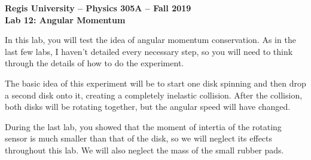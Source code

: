 \documentclass[11pt]{article}
\begin{document}
\begin{center}
{\bf{Regis University -- Physics 305A -- Fall 2019}} \\
{\bf{Lab 12: Angular Momentum}} \\
\end{center}

In this lab, you will test the idea of angular momentum conservation.
As in the last few labs, I haven't detailed every necessary step, so you will need to 
think through the details of how to do the experiment.

The basic idea of this experiment will be to start one disk spinning and then drop a second disk onto it, creating a completely inelastic collision. After the collision, both disks will be rotating together, but the angular speed will have changed.

During the last lab, you showed that the moment of intertia of the rotating sensor is much smaller than that of the disk, so we will neglect its effects throughout this lab. We will also neglect the mass of the small rubber pads.
\bigskip
\end{document}
